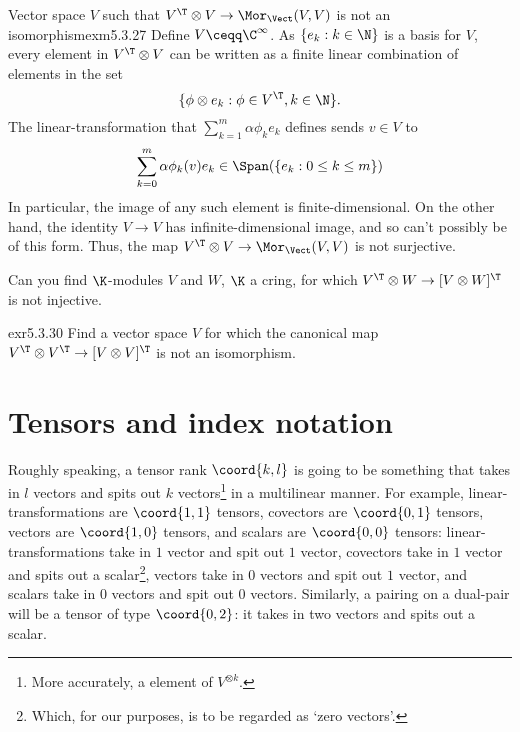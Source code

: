 \begin{exm}{Vector space $V$ such that $V^{\T}\otimes V\rightarrow \Mor _{\Vect}(V,V)$ is not an isomorphism}{exm5.3.27}
	Define $V\ceqq \C ^{\infty}$.  As $\{ e_k:k\in \N \}$ is a basis for $V$, every element in $V^{\T}\otimes V$ can be written as a finite linear combination of elements in the set
	\begin{equation}
		\{ \phi \otimes e_k:\phi \in V^{\T},k\in \N \}.
	\end{equation}
	The linear-transformation that $\sum _{k=1}^m\alpha \phi _ke_k$ defines sends $v\in V$ to
	\begin{equation}
		\sum _{k=0}^m\alpha \phi _k(v)e_k\in \Span (\{ e_k:0\leq k\leq m \} )
	\end{equation}
	In particular, the image of any such element is finite-dimensional.  On the other hand, the identity $V\rightarrow V$ has infinite-dimensional image, and so can't possibly be of this form.  Thus, the map $V^{\T}\otimes V\rightarrow \Mor _{\Vect}(V,V)$ is not surjective.
\end{exm}
\begin{exr}{}{}
	Can you find $\K$-modules $V$ and $W$, $\K$ a cring, for which $V^{\T}\otimes W\rightarrow [V\otimes W]^{\T}$ is not injective.
\end{exr}
\begin{exr}{}{exr5.3.30}
	Find a vector space $V$ for which the canonical map $V^{\T}\otimes V^{\T}\rightarrow [V\otimes V]^{\T}$ is not an isomorphism.
\end{exr}

\section{Tensors and index notation}\label{sct5.4}

Roughly speaking, a tensor rank $\coord{k,l}$ is going to be something that takes in $l$ vectors and spits out $k$ vectors\footnote{More accurately, a element of $V^{\otimes k}$.} in a multilinear manner.  For example, linear-transformations are $\coord{1,1}$ tensors, covectors are $\coord{0,1}$ tensors, vectors are $\coord{1,0}$ tensors, and scalars are $\coord{0,0}$ tensors:  linear-transformations take in $1$ vector and spit out $1$ vector, covectors take in $1$ vector and spits out a scalar\footnote{Which, for our purposes, is to be regarded as `zero vectors'.}, vectors take in $0$ vectors and spit out $1$ vector, and scalars take in $0$ vectors and spit out $0$ vectors.  Similarly, a pairing on a dual-pair will be a tensor of type $\coord{0,2}$:  it takes in two vectors and spits out a scalar.

